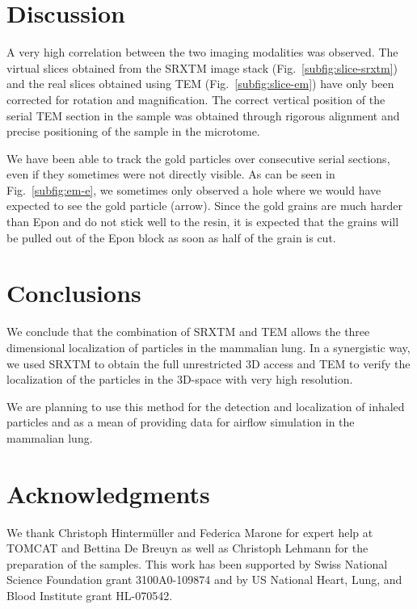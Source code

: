 \section{Discussion}
A very high correlation between the two imaging modalities was observed. The virtual slices obtained from the SRXTM image stack (Fig.~\ref{subfig:slice-srxtm}) and the real slices obtained using TEM (Fig.~\ref{subfig:slice-em}) have only been corrected for rotation and magnification. The correct vertical position of the serial TEM section in the sample was obtained through rigorous alignment and precise positioning of the sample in the microtome.

We have been able to track the gold particles over consecutive serial sections, even if they sometimes were not directly visible. As can be seen in Fig.~\ref{subfig:em-e}, we sometimes only observed a hole where we would have expected to see the gold particle (arrow). Since the gold grains are much harder than Epon and do not stick well to the resin, it is expected that the grains will be pulled out of the Epon block as soon as half of the grain is cut.

\section{Conclusions}
We conclude that the combination of SRXTM and TEM allows the three dimensional localization of particles in the mammalian lung. In a synergistic way, we used SRXTM to obtain the full unrestricted 3D access and TEM to verify the localization of the particles in the 3D-space with very high resolution. 

We are planning to use this method for the detection and localization of inhaled particles and as a mean of providing data for airflow simulation in the mammalian lung.

\section{Acknowledgments}
We thank Christoph Hinterm\"uller and Federica Marone for expert help at TOMCAT and Bettina De Breuyn as well as Christoph Lehmann for the preparation of the samples. This work has been supported by Swiss National Science Foundation grant 3100A0-109874 and by US National Heart, Lung, and Blood Institute grant HL-070542.